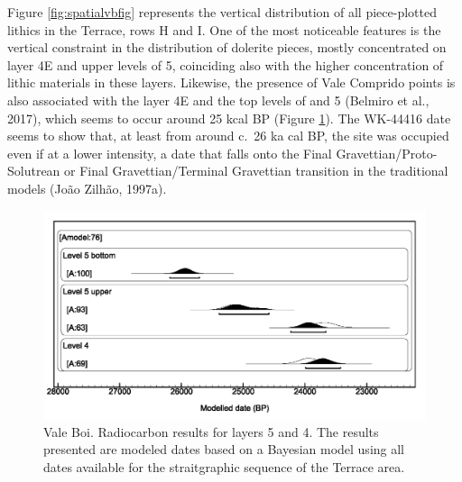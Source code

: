 \documentclass[12pt,twoside]{reedthesis}
\begin{document}
Figure \ref{fig:spatialvbfig} represents the vertical distribution of all piece-plotted lithics in the Terrace, rows H and I. One of the most noticeable features is the vertical constraint in the distribution of dolerite pieces, mostly concentrated on layer 4E and upper levels of 5, coinciding also with the higher concentration of lithic materials in these layers. Likewise, the presence of Vale Comprido points is also associated with the layer 4E and the top levels of and 5 (Belmiro et al., 2017), which seems to occur around 25 kcal BP (Figure \ref{fig:c14VB}). The WK-44416 date seems to show that, at least from around c.~26 ka cal BP, the site was occupied even if at a lower intensity, a date that falls onto the Final Gravettian/Proto-Solutrean or Final Gravettian/Terminal Gravettian transition in the traditional models (João Zilhão, 1997a).
\begin{figure}

{\centering \includegraphics[width=0.6\linewidth]{figure/c14_VB} 

}

\caption{Vale Boi. Radiocarbon results for layers 5 and 4. The results presented are modeled dates based on a Bayesian model using all dates available for the straitgraphic sequence of the Terrace area.}\label{fig:c14VB}
\end{figure}
~

~
\end{document}
